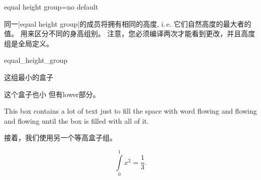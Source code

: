 \begin{docTcbKey}[][doc updated=2014-11-07]{equal height group}{=}{no default}

同一|equal height group|的成员将拥有相同的高度, i.\,e. 它们自然高度的最大者的值。
 用来区分不同的身高组别。
注意，您必须编译两次才能看到更改，并且高度组是全局定义。

\begin{exdispExample}[runs=2]{equal_height_group}

\begin{tcolorbox}[equal height group=A,adjusted title={一}]
这组最小的盒子
\end{tcolorbox}%
\begin{tcolorbox}[equal height group=A,adjusted title={二}]
这个盒子也小
  \tcblower
但有lower部分。
\end{tcolorbox}%
\begin{tcolorbox}[equal height group=A,adjusted title={三}]
  This box contains a lot of text just to fill the space
  with word flowing and flowing and flowing until the box
  is filled with all of it.
\end{tcolorbox}\linebreak
%
%
\begin{tcolorbox}[equal height group=B]
接着，我们使用另一个等高盒子组。
\end{tcolorbox}%
\begin{tcolorbox}[equal height group=B,after=]
  \begin{equation*}
    \int\limits_{0}^{1} x^2 = \frac13.
  \end{equation*}
\end{tcolorbox}
\end{exdispExample}
\end{docTcbKey}


